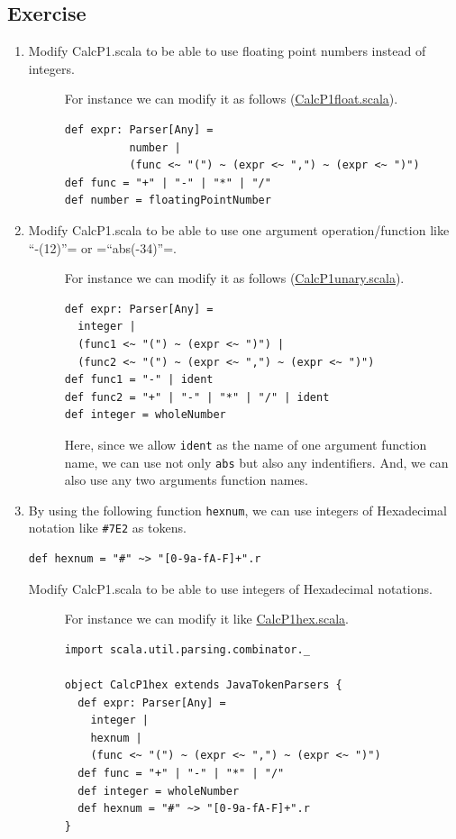 \documentclass[11pt]{article}
\begin{document}
\subsection{Exercise}
\label{sec:orgheadline6}
\begin{enumerate}
\item Modify CalcP1.scala to be able to use floating point numbers instead of integers. 
\begin{description}
\item[{}] For instance we can modify it as follows (\href{prog/parser/CalcP1float.scala}{CalcP1float.scala}).
\begin{verbatim}
def expr: Parser[Any] = 
          number | 
          (func <~ "(") ~ (expr <~ ",") ~ (expr <~ ")")
def func = "+" | "-" | "*" | "/"
def number = floatingPointNumber
\end{verbatim}
\end{description}
\item Modify CalcP1.scala to be able to use one argument operation/function like ``-(12)''= or =``abs(-34)''=. 
\begin{description}
\item[{}] For instance we can modify it as follows (\href{prog/parser/CalcP1unary.scala}{CalcP1unary.scala}). 
\begin{verbatim}
def expr: Parser[Any] =
  integer |
  (func1 <~ "(") ~ (expr <~ ")") |
  (func2 <~ "(") ~ (expr <~ ",") ~ (expr <~ ")")
def func1 = "-" | ident
def func2 = "+" | "-" | "*" | "/" | ident
def integer = wholeNumber
\end{verbatim}
Here, since we allow \texttt{ident} as the name of one argument
function name, we can use not only \texttt{abs} but also any
indentifiers. And, we can also use any two arguments function
names.
\end{description}
\item By using the following function \texttt{hexnum}, we can use integers of
Hexadecimal notation like \texttt{\#7E2} as tokens. 
\begin{verbatim}
def hexnum = "#" ~> "[0-9a-fA-F]+".r
\end{verbatim}
Modify CalcP1.scala to be able to use integers of Hexadecimal notations.
\begin{description}
\item[{}] For instance we can modify it like \href{prog/parser/CalcP1hex.scala}{CalcP1hex.scala}. 
\begin{verbatim}
import scala.util.parsing.combinator._

object CalcP1hex extends JavaTokenParsers {
  def expr: Parser[Any] =
    integer |
    hexnum |
    (func <~ "(") ~ (expr <~ ",") ~ (expr <~ ")")
  def func = "+" | "-" | "*" | "/"
  def integer = wholeNumber
  def hexnum = "#" ~> "[0-9a-fA-F]+".r
}
\end{verbatim}
\end{description}
\end{enumerate}
\end{document}
